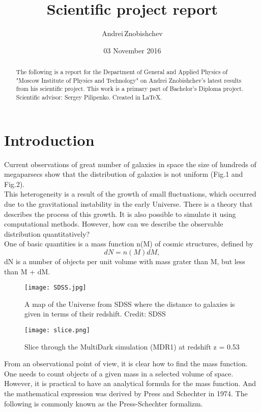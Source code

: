 \documentclass[11pt]{article}
\title{Scientific project report}
\author{Andrei\,Znobishchev}
\date{03 November 2016}
\begin{document}
\maketitle

\begin{abstract}
	The following is a report for the Department of General and Applied Physics of "Moscow Institute of Physics and Technology" on  Andrei Znobishchev's latest results from his scientific project. This work is a primary part of Bachelor's Diploma project.\\
	Scientific advisor: Sergey Pilipenko. 
	Created in \LaTeX.
\end{abstract}

\section{Introduction}
Current observations of great number of galaxies in space the size of hundreds of megaparsecs show that the distribution of galaxies is not uniform (Fig.1 and Fig.2). \\

This heterogeneity is a result of the growth of small fluctuations, which occurred due to the gravitational instability in the early Universe. There is a theory that describes the process of this growth. It is also possible to simulate it using computational methods. However, how can we describe the observable distribution quantitatively?\\
One of basic quantities is a mass function n(M) of cosmic structures, defined by\\
\begin{equation}
	dN = n(M)dM,
\end{equation}
dN is a number of objects per unit volume with mass grater than M, but less than M + dM.
 
\begin{figure}[h]
\centering
\texttt{[image: SDSS.jpg]}
\caption{A map of the Universe from SDSS where the distance to galaxies is given in terms of their redshift. Credit: SDSS}
\end{figure}
\begin{figure}[H]
\centering
\texttt{[image: slice.png]}
\caption{Slice through the MultiDark simulation (MDR1) at redshift z = 0.53 }  
\end{figure}

 From an observational point of view, it is clear how to find the mass function. One needs to count objects of a given mass in a selected volume of space. However, it is practical to have an analytical formula for the mass function. And the mathematical expression was derived by Press and Schechter in 1974. The following is commonly known as the Press-Schechter formalizm.\\
\end{document}
